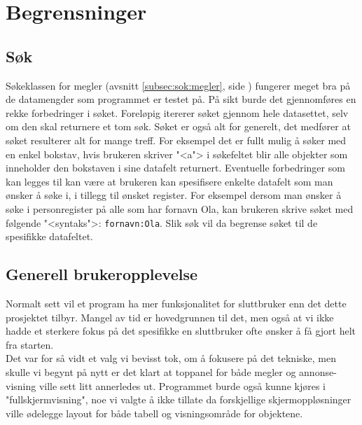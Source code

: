 \section{Begrensninger}

\subsection{Søk} \label{subsec:begrensinger:sok}
Søkeklassen for megler (avsnitt \ref{subsec:sok:megler}, side \pageref{subsec:sok:megler}) fungerer meget bra på de datamengder som programmet er testet på. På sikt burde det gjennomføres en rekke forbedringer i søket. Foreløpig itererer søket gjennom hele datasettet, selv om den skal returnere et tom søk. Søket er også alt for generelt, det medfører at søket resulterer alt for mange treff. For eksempel det er fullt mulig å søker med en enkel bokstav, hvis brukeren skriver "<a"> i søkefeltet blir alle objekter som inneholder den bokstaven i sine datafelt returnert. Eventuelle forbedringer som kan legges til kan være at brukeren kan spesifisere enkelte datafelt som man ønsker å søke i, i tillegg til ønsket register. For eksempel dersom man ønsker å søke i personregister på alle som har fornavn Ola, kan brukeren skrive søket med følgende "<syntaks">: \texttt{fornavn:Ola}. Slik søk vil da begrense søket til de spesifikke datafeltet.

\subsection{Generell brukeropplevelse}
Normalt sett vil et program ha mer funksjonalitet for sluttbruker enn det dette prosjektet tilbyr. Mangel av tid er hovedgrunnen til det, men også at vi ikke hadde et sterkere fokus på det spesifikke en sluttbruker ofte ønsker å få gjort helt fra starten. \\
Det var for så vidt et valg vi bevisst tok, om å fokusere på det tekniske, men skulle vi begynt på nytt er det klart at toppanel for både megler og annonse-visning ville sett litt annerledes ut. Programmet burde også kunne kjøres i "fullskjermvisning", noe vi valgte å ikke tillate da forskjellige skjermoppløsninger ville ødelegge layout for både tabell og visningsområde for objektene.
